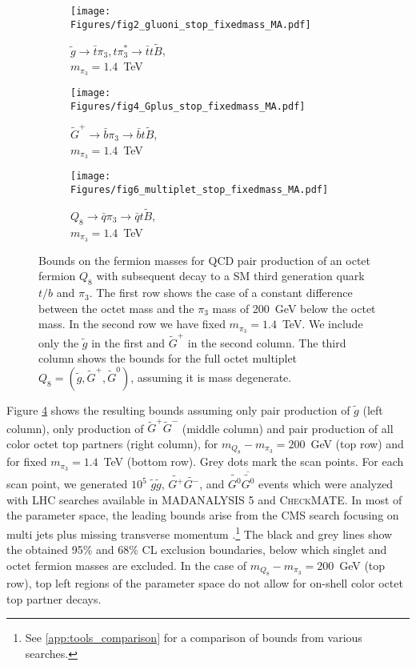 \documentclass[preprintnumbers,nofootinbib,showpacs,eqsecnum,pre,12pt]{revtex4-1}
\begin{document}
\begin{figure}[t]
	
	\begin{subfigure}[]{0.31\linewidth}
		\centering
		\texttt{[image: Figures/fig2\_gluoni\_stop\_fixedmass\_MA.pdf]} 
		\caption{$\tilde g\to \bar t\pi_3, t\pi_3^*\to \bar t t\tilde B$,\\ $m_{\pi_3}=1.4$~TeV}\label{fig:fig2_gluoni_stop_fixedmass_MA}
	\end{subfigure}
	\begin{subfigure}[]{0.31\linewidth}
		\centering
		\texttt{[image: Figures/fig4\_Gplus\_stop\_fixedmass\_MA.pdf]} 
		\caption{$\tilde G^+\to \bar b\pi_3\to \bar bt\tilde B$,\\ $m_{\pi_3}=1.4$~TeV}\label{fig:fig4_Gplus_stop_fixedmass_MA}
	\end{subfigure}
	\begin{subfigure}[]{0.31\linewidth}
		\centering
		\texttt{[image: Figures/fig6\_multiplet\_stop\_fixedmass\_MA.pdf]} 
		\caption{$Q_8\to \bar q\pi_3\to \bar qt \tilde B$,\\ $m_{\pi_3}=1.4$~TeV}\label{fig:fig6_multiplet_stop_fixedmass_MA}
	\end{subfigure}
	\caption{Bounds on the fermion masses for QCD pair production of an octet fermion $Q_8$ with subsequent decay to a SM third generation quark $t/b$ and  $\pi_3$. 
	The first row shows the case of a constant difference between the octet mass and the $\pi_3$ mass of 200~GeV below the octet mass. In the second row we have fixed $m_{\pi_3}=1.4$~TeV.
	We include only the $\tilde g$ in the first and $\tilde G^+$ in the second column.
	The third column shows the bounds for the full octet multiplet $Q_8=(\tilde g,\tilde G^+,\tilde G^0)$, assuming it is mass degenerate.}
	\label{fig:bounds_stop}
\end{figure}

Figure \ref{fig:bounds_stop} shows the resulting bounds assuming only pair production of $\tilde{g}$ (left column), only production of $\tilde G^+\tilde{G}^-$ (middle column) and pair production of all color octet top partners (right column), for $m_{Q_8}-m_{\pi_3} = 200$~GeV (top row) and for fixed $m_{\pi_3}=1.4$~TeV (bottom row). Grey dots mark the scan points. For each scan point, we generated $10^5$  $\tilde{g}\tilde{g}$, $\tilde{G^+}\tilde{G^-}$, and $\tilde{G^0} \overline{\tilde{G^0}}$ events which were analyzed with LHC searches available in \textsc{MADANALYSIS 5} and \textsc{CheckMATE}. In most of the parameter space, the leading bounds arise from the CMS search focusing on multi jets plus missing transverse momentum  \cite{CMS:2019zmd,Mrowietz:2020ztq}.\footnote{See \cref{app:tools_comparison} for a comparison of bounds from various searches.} 
The black and grey  lines show the obtained 95\% and 68\% CL exclusion boundaries, below which singlet and octet fermion masses are excluded. In the case of $m_{Q_8}-m_{\pi_3} = 200$~GeV (top row), top left regions of the parameter space do not allow for on-shell color octet top partner decays.
\end{document}
